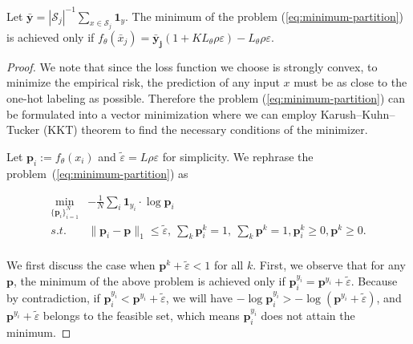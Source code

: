 \begin{lemma}
\label{lemma:vector-minimization}
Let $\bar{\mathbf{y}} ={|\mathcal{S}_j|}^{-1} \sum_{x \in \mathcal{S}_j} \mathbf{1}_{y}$.  The minimum of the problem (\ref{eq:minimum-partition}) is achieved only if $f_\theta(\bar{x}_j) = \mathbf{\bar{y}_j}(1 + KL_\theta \rho\varepsilon) - L_\theta\rho\varepsilon$.
\end{lemma}


\begin{proof}
We note that since the loss function we choose is strongly convex, to minimize the empirical risk, the prediction of any input $x$ must be as close to the one-hot labeling as possible. Therefore the problem (\ref{eq:minimum-partition}) can be formulated into a vector minimization where we can employ Karush–Kuhn–Tucker (KKT) theorem to find the necessary conditions of the minimizer. 

Let $\mathbf{p}_i := f_\theta(x_i)$ and $\tilde{\varepsilon} = L\rho\varepsilon$ for simplicity.
We rephrase the problem~(\ref{eq:minimum-partition}) as 

\begin{equation}
\label{eq:vector-minimization2}
\begin{aligned}
    \min_{\{\mathbf{p}_i\}_{i=1}^N} & - \frac{1}{N} \sum_{i} \mathbf{1}_{y_i} \cdot \log \mathbf{p}_i \\
    s.t.~~& \|\mathbf{p}_i - \mathbf{p}\|_1 \le \tilde{\varepsilon}, ~\sum_k \mathbf{p}_i^k = 1, ~\sum_k \mathbf{p}^k = 1, \mathbf{p}^k_i \ge 0, \mathbf{p}^k \ge 0. \\
\end{aligned}
\end{equation}

We first discuss the case when $\mathbf{p}^k + \tilde{\varepsilon} < 1$ for all $k$. 
First, we observe that for any $\mathbf{p}$, the minimum of the above problem is achieved only if $\mathbf{p}_i^{y_i} = \mathbf{p}^{y_i} + \tilde{\varepsilon}$. Because by contradiction, if $\mathbf{p}_i^{y_i} < \mathbf{p}^{y_i} + \tilde{\varepsilon}$, we will have $-\log \mathbf{p}_i^{y_i} > -\log(\mathbf{p}^{y_i} + \tilde{\varepsilon}) $, and $\mathbf{p}^{y_i} + \tilde{\varepsilon}$ belongs to the feasible set, which means $\mathbf{p}_i^{y_i}$ does not attain the minimum.


\end{proof}
